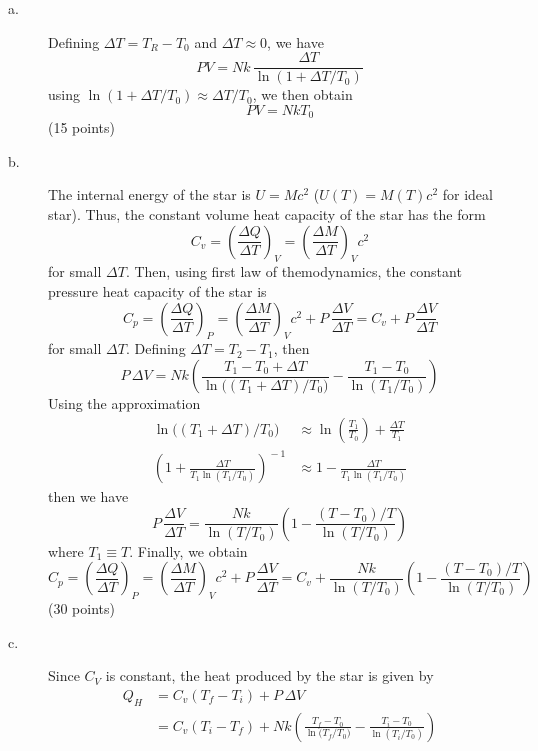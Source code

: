 \begin{description}
\item[a.] Defining $\Delta T = T_R - T_0$ and $\Delta T \approx 0$, we have
  \[
    PV = Nk\,\frac{\Delta T}{\ln(1 + \Delta T/T_0)} \tag{3}
  \]
  using $\ln(1 + \Delta T/T_0) \approx \Delta T/T_0$, we then obtain
  \[
    PV = NkT_0 \tag{4}
  \]
  \hfill(15 points)
\item[b.] The internal energy of the star is $U = Mc^2$ ($U(T) = M(T)c^2$ for
  ideal star). Thus, the constant volume heat capacity of the star has the form
  \[
    C_v = \left(\frac{\Delta Q}{\Delta T}\right)_{\!V}
        = \left(\frac{\Delta M}{\Delta T}\right)_{\!V} c^2
  \]
  for small $\Delta T$. Then, using first law of themodynamics, the constant
  pressure heat capacity of the star is
  \[
    C_p = \left(\frac{\Delta Q}{\Delta T}\right)_{\!P}
        = \left(\frac{\Delta M}{\Delta T}\right)_{\!V} c^2 + P\,\frac{\Delta V}{\Delta T}
        = C_v + P\,\frac{\Delta V}{\Delta T}
  \]
  for small $\Delta T$. Defining $\Delta T = T_2 - T_1$, then
  \[
    P\,\Delta V = Nk\left(
      \frac{T_1 - T_0 + \Delta T}{\ln\!\big((T_1 + \Delta T)/T_0\big)}
      - \frac{T_1 - T_0}{\ln(T_1/T_0)}\right)
  \]
  Using the approximation
  \begin{align*}
    \ln\!\big((T_1 + \Delta T)/T_0\big)
      &\approx \ln\!\left(\frac{T_1}{T_0}\right) + \frac{\Delta T}{T_1} \\
    \left(1 + \frac{\Delta T}{T_1\ln(T_1/T_0)}\right)^{\!-1}
      &\approx 1 - \frac{\Delta T}{T_1\ln(T_1/T_0)}
  \end{align*}
  then we have
  \[
    P\,\frac{\Delta V}{\Delta T}
      = \frac{Nk}{\ln(T/T_0)}\left(1 - \frac{(T - T_0)/T}{\ln(T/T_0)}\right)
  \]
  where $T_1 \equiv T$. Finally, we obtain
  \[
    C_p = \left(\frac{\Delta Q}{\Delta T}\right)_{\!P}
        = \left(\frac{\Delta M}{\Delta T}\right)_{\!V} c^2 + P\,\frac{\Delta V}{\Delta T}
        = C_v + \frac{Nk}{\ln(T/T_0)}\left(1 - \frac{(T - T_0)/T}{\ln(T/T_0)}\right)
  \]
  \hfill(30 points)
\item[c.] Since $C_V$ is constant, the heat produced by the star is given by
  \begin{align*}
    Q_H &= C_v\left(T_f - T_i\right) + P\,\Delta V \\
        &= C_v\left(T_i - T_f\right) %
         + Nk\left(\frac{T_f - T_0}{\ln\!\big(T_f/T_0\big)}
         - \frac{T_i - T_0}{\ln(T_i/T_0)}\right)
  \end{align*}

\end{description}
